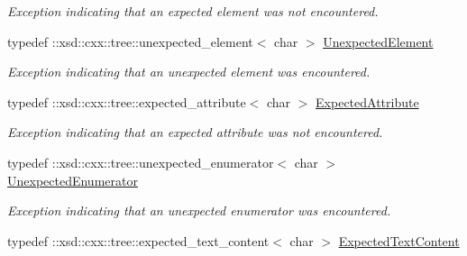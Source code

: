 \begin{DoxyCompactItemize}
\begin{DoxyCompactList}\small\item\em Exception indicating that an expected element was not encountered. \item\end{DoxyCompactList}\item 
\hypertarget{namespacexml__schema_a9d851681cf40547856f7e7ef2c2e1f2f}{
typedef ::xsd::cxx::tree::unexpected\_\-element$<$ char $>$ \hyperlink{namespacexml__schema_a9d851681cf40547856f7e7ef2c2e1f2f}{UnexpectedElement}}
\label{namespacexml__schema_a9d851681cf40547856f7e7ef2c2e1f2f}

\begin{DoxyCompactList}\small\item\em Exception indicating that an unexpected element was encountered. \item\end{DoxyCompactList}\item 
\hypertarget{namespacexml__schema_a78581d3d4ffe1356dfe8802b25cda56c}{
typedef ::xsd::cxx::tree::expected\_\-attribute$<$ char $>$ \hyperlink{namespacexml__schema_a78581d3d4ffe1356dfe8802b25cda56c}{ExpectedAttribute}}
\label{namespacexml__schema_a78581d3d4ffe1356dfe8802b25cda56c}

\begin{DoxyCompactList}\small\item\em Exception indicating that an expected attribute was not encountered. \item\end{DoxyCompactList}\item 
\hypertarget{namespacexml__schema_afddcc3f30878e928671a15151128783b}{
typedef ::xsd::cxx::tree::unexpected\_\-enumerator$<$ char $>$ \hyperlink{namespacexml__schema_afddcc3f30878e928671a15151128783b}{UnexpectedEnumerator}}
\label{namespacexml__schema_afddcc3f30878e928671a15151128783b}

\begin{DoxyCompactList}\small\item\em Exception indicating that an unexpected enumerator was encountered. \item\end{DoxyCompactList}\item 
\hypertarget{namespacexml__schema_ae1126b64dc28661806114ccce3a9a568}{
typedef ::xsd::cxx::tree::expected\_\-text\_\-content$<$ char $>$ \hyperlink{namespacexml__schema_ae1126b64dc28661806114ccce3a9a568}{ExpectedTextContent}}
\label{namespacexml__schema_ae1126b64dc28661806114ccce3a9a568}


\end{DoxyCompactItemize}
